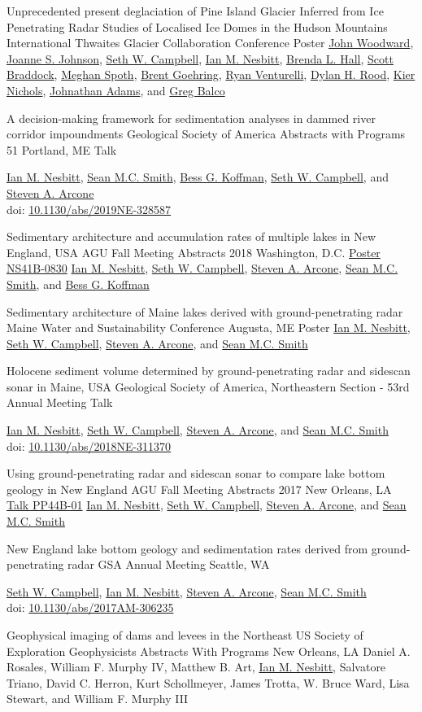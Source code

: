 \documentclass[a4paper,12pt,sans,colorlinks]{moderncv}
\newcommand{\me}{\href{https://www.iannesbitt.org}{Ian M. Nesbitt}}
\newcommand{\seth}{\href{https://www.alpinesciences.net}{Seth W. Campbell}}
\newcommand{\sean}{\href{https://umaine.edu/earthclimate/people/sean-m-c-smith/}{Sean M.C. Smith}}
\newcommand{\bess}{\href{https://www.colby.edu/directory/profile/bess.koffman/}{Bess G. Koffman}}
\newcommand{\stevearcone}{\href{https://engineering.dartmouth.edu/community/faculty/steven-arcone}{Steven A. Arcone}}
\newcommand{\johnwoodward}{\href{https://www.northumbria.ac.uk/about-us/our-staff/w/john-woodward}{John Woodward}}
\newcommand{\joannejohnson}{\href{https://www.bas.ac.uk/profile/jsj/}{Joanne S. Johnson}}
\newcommand{\brenda}{\href{https://climatechange.umaine.edu/people/brenda-hall/}{Brenda L. Hall}}
\newcommand{\scott}{\href{https://climatechange.umaine.edu/people/scott-braddock/}{Scott Braddock}}
\newcommand{\meghan}{\href{https://climatechange.umaine.edu/people/meghan-spoth/}{Meghan Spoth}}
\newcommand{\brent}{\href{https://sse.tulane.edu/eens/faculty/goehring}{Brent Goehring}}
\newcommand{\ryanventurelli}{\href{https://sse.tulane.edu/eens/faculty/venturelli}{Ryan Venturelli}}
\newcommand{\dylanrood}{\href{http://www.imperial.ac.uk/people/d.rood}{Dylan H. Rood}}
\newcommand{\kiernichols}{\href{https://www.researchgate.net/profile/Keir-Nichols}{Kier Nichols}}
\newcommand{\johnathanadams}{\href{https://thwaitesglacier.org/people/jonathan-adams}{Johnathan Adams}}
\newcommand{\gregbalco}{\href{https://www.bgc.org/greg-balco}{Greg Balco}}
\newcommand{\agunola}{\href{https://agu.confex.com/agu/fm17/meetingapp.cgi/Paper/260265}{Talk PP44B-01}}
\newcommand{\agudc}{\href{https://agu.confex.com/agu/fm18/meetingapp.cgi/Paper/449070}{Poster NS41B-0830}}
\newcommand{\doi}[1]{%
    \href{https://doi.org/#1}{#1}
}
\begin{document}
{Unprecedented present deglaciation of Pine Island Glacier
Inferred from Ice Penetrating Radar Studies of Localised
Ice Domes in the Hudson Mountains}
{International Thwaites Glacier Collaboration Conference}
{}
{Poster}
{
    \johnwoodward{}, \joannejohnson{}, \seth{}, \me{}, \brenda{}, \scott{},
    \meghan{}, \brent{}, \ryanventurelli{}, \dylanrood{}, \kiernichols{},
    \johnathanadams{}, and \gregbalco{}
}

{A decision-making framework for sedimentation analyses in
dammed river corridor impoundments}
{Geological Society of America Abstracts with Programs 51}
{Portland, ME}
{Talk}
{
    \me{}, \sean{}, \bess{}, \seth{}, and \stevearcone{}
    \\
    doi: \doi{10.1130/abs/2019NE-328587}
}

{Sedimentary architecture and accumulation rates of
multiple lakes in New England, USA}
{AGU Fall Meeting Abstracts 2018}
{Washington, D.C.}
{\agudc}
{
    \me{}, \seth{}, \stevearcone{}, \sean{}, and \bess{}
}

{Sedimentary architecture of Maine lakes derived
with ground-penetrating radar}
{Maine Water and Sustainability Conference}
{Augusta, ME}
{Poster}
{
    \me{}, \seth{}, \stevearcone{}, and \sean{}
}

{Holocene sediment volume determined by
ground-penetrating radar and sidescan sonar in Maine, USA}
{Geological Society of America, Northeastern Section - 53rd Annual Meeting}
{}
{Talk}
{
    \me{}, \seth{}, \stevearcone{}, and \sean{}
    \\
    doi: \doi{10.1130/abs/2018NE-311370}
}

{Using ground-penetrating radar and sidescan sonar to
compare lake bottom geology in New England}
{AGU Fall Meeting Abstracts 2017}
{New Orleans, LA}
{\agunola}
{
    \me{}, \seth{}, \stevearcone{}, and \sean{}
}

{New England lake bottom geology and sedimentation
rates derived from ground-penetrating radar}
{GSA Annual Meeting}
{Seattle, WA}
{}
{
    \seth{}, \me{}, \stevearcone{}, \sean{}
    \\
    doi: \doi{10.1130/abs/2017AM-306235}
}

{Geophysical imaging of dams and levees in the Northeast US}
{Society of Exploration Geophysicists Abstracts With Programs}
{New Orleans, LA}
{}
{Daniel A. Rosales, William F. Murphy IV, Matthew B. Art,
\me, Salvatore Triano, David C. Herron, Kurt Schollmeyer,
James Trotta, W. Bruce Ward, Lisa Stewart, and William F.
Murphy III}
\end{document}
